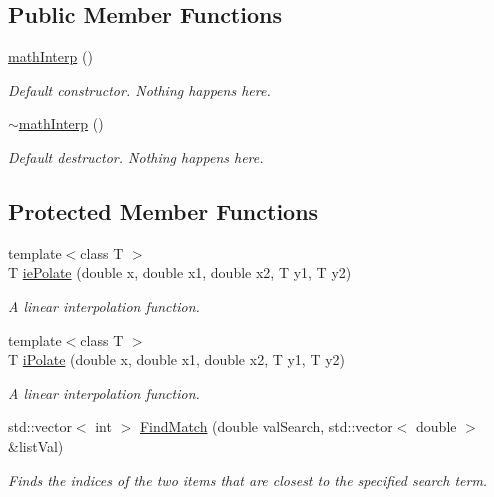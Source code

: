 \subsection*{Public Member Functions}
\begin{DoxyCompactItemize}
\item 
\hyperlink{classosea_1_1ofreq_1_1math_interp_af18d4ccbcaa49aa454e3b8806f5723b7}{math\-Interp} ()
\begin{DoxyCompactList}\small\item\em Default constructor. Nothing happens here. \end{DoxyCompactList}\item 
\hyperlink{classosea_1_1ofreq_1_1math_interp_a153d547357553accd5aa3cce44e5e46f}{$\sim$math\-Interp} ()
\begin{DoxyCompactList}\small\item\em Default destructor. Nothing happens here. \end{DoxyCompactList}\end{DoxyCompactItemize}
\subsection*{Protected Member Functions}
\begin{DoxyCompactItemize}
\item 
{\footnotesize template$<$class T $>$ }\\T \hyperlink{classosea_1_1ofreq_1_1math_interp_a967df417677afc033e40e59e6924373c}{ie\-Polate} (double x, double x1, double x2, T y1, T y2)
\begin{DoxyCompactList}\small\item\em A linear interpolation function. \end{DoxyCompactList}\item 
{\footnotesize template$<$class T $>$ }\\T \hyperlink{classosea_1_1ofreq_1_1math_interp_a48d4f60771f130dd5a0e84aa31f98936}{i\-Polate} (double x, double x1, double x2, T y1, T y2)
\begin{DoxyCompactList}\small\item\em A linear interpolation function. \end{DoxyCompactList}\item 
std\-::vector$<$ int $>$ \hyperlink{classosea_1_1ofreq_1_1math_interp_aeea83b19522f9529d9dc93ec0197682b}{Find\-Match} (double val\-Search, std\-::vector$<$ double $>$ \&list\-Val)
\begin{DoxyCompactList}\small\item\em Finds the indices of the two items that are closest to the specified search term. \end{DoxyCompactList}\end{DoxyCompactItemize}
